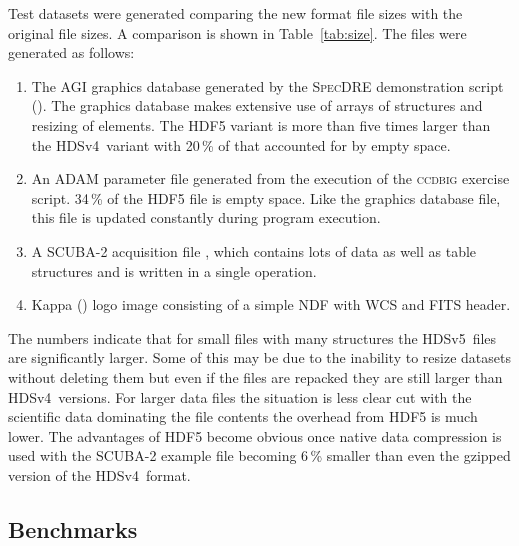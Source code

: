 \documentclass[final,authoryear,5p,times,twocolumn]{elsarticle}
\newcommand{\new}{HDSv5}
\newcommand{\old}{HDSv4}
\begin{document}
Test datasets were generated comparing the new format file sizes with
the original file sizes. A comparison is shown in
Table~\ref{tab:size}. The files were generated as follows:

\begin{enumerate}
\item The AGI graphics database generated by the \textsc{SpecDRE}
  demonstration script (). The graphics database makes
  extensive use of arrays of structures and resizing of elements. The
  HDF5 variant is more than five times larger than the \old\ variant
  with 20\,\% of that accounted for by empty space.

\item An ADAM parameter file generated from the execution of the
  \textsc{ccdbig} \citep{SSN69} exercise script. 34\,\% of the HDF5
  file is empty space. Like the graphics database file, this file is
  updated constantly during program execution.

\item A SCUBA-2 acquisition file \citep{2014SPIE.9153E..03B}, which contains
  lots of data as well as table structures and is written in a single operation.

\item Kappa () logo image consisting of a simple NDF
  with WCS and FITS header.
\end{enumerate}

The numbers indicate that for small files with many structures the
\new\ files are significantly larger. Some of this may be due to the
inability to resize datasets without deleting them but even if the
files are repacked they are still larger than \old\ versions.  For
larger data files the situation is less clear cut with the scientific
data dominating the file contents the overhead from HDF5 is much
lower. The advantages of HDF5 become obvious once native data
compression is used with the SCUBA-2 example file becoming 6\,\%
smaller than even the gzipped version of the \old\ format.


\subsection{Benchmarks}
\end{document}
